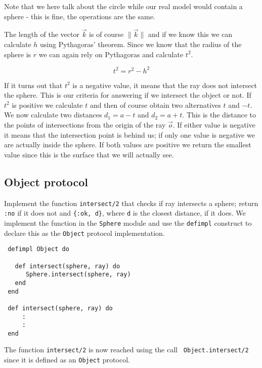 \documentclass[a4paper,11pt]{article}
\begin{document}
Note that we here talk about the circle while our real model would
contain a sphere - this is fine, the operations are the same.


The length of the vector $\vec{k}$ is of course $\|\vec{k}\|$
and if we know this we can calculate $h$
using Pythagoras' theorem. Since we know that the radius of the
sphere is $r$ we can again rely on Pythagoras and calculate $t^2$.

$$ t^2 = r^2 - h^2 $$

If it turns out that $t^2$ is a negative value, it means that the ray
does not intersect the sphere. This is our criteria for answering if
we intersect the object or not. If $t^2$ is positive we calculate $t$
and then of course obtain two alternatives $t$ and $-t$.  We now
calculate two distances $d_1 = a - t$ and $d_2 = a + t$.  This is the
distance to the points of intersections from the origin of the ray
$\vec{o}$.  If either value is negative it means that the intersection
point is behind us; if only one value is negative we are actually
inside the sphere. If both values are positive we return the smallest
value since this is the surface that we will actually see.

\subsection*{Object protocol}

Implement the function {\tt intersect/2} that checks if ray intersects
a sphere; return {\tt :no} if it does not and {\tt \{:ok, d\}}, where
{\tt d} is the closest distance, if it does. We implement the function
in the {\tt Sphere} module and use the {\tt defimpl} construct to
declare this as the {\tt Object} protocol implementation.

\begin{verbatim}
 defimpl Object do

   def intersect(sphere, ray) do
      Sphere.intersect(sphere, ray)
   end
 end

 def intersect(sphere, ray) do
     :
     :
 end
\end{verbatim}

 The function {\tt intersect/2} is now reached using the call {\tt
   Object.intersect/2} since it is defined as an {\tt Object}
 protocol.

 

\end{document}
